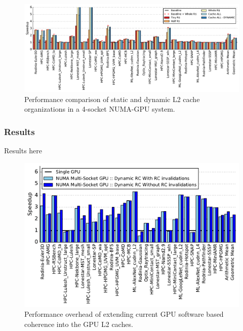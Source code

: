 \begin{figure}[tp]
    \centering
    \includegraphics[width=1.0\textwidth]{figures/plot_remote_cache_WB.pdf}
    \caption{Performance comparison of static and dynamic L2 cache organizations
    in a 4-socket NUMA-GPU system.}
    \label{fig:caching}
\end{figure}

\subsubsection{Results}
Results here

\begin{figure}[t]
    \centering
    \includegraphics[width=1.0\columnwidth]{figures/plot_no_inval_WB.pdf}
    \caption{Performance overhead of extending current GPU software based coherence
    into the GPU L2 caches.}
    \label{fig:invalidations}
\end{figure}